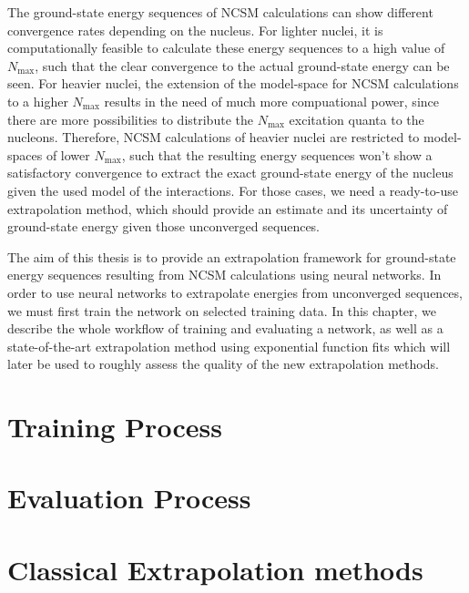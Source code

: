The ground-state energy sequences of NCSM calculations can show different convergence rates depending on the nucleus. For lighter nuclei, it is computationally feasible to calculate these energy sequences to a high value of $N_\mathrm{max}$, such that the clear convergence to the actual ground-state energy can be seen. For heavier nuclei, the extension of the model-space for NCSM calculations to a higher $N_\mathrm{max}$ results in the need of much more compuational power, since there are more possibilities to distribute the $N_\mathrm{max}$ excitation quanta to the nucleons. Therefore, NCSM calculations of heavier nuclei are restricted to model-spaces of lower $N_\mathrm{max}$, such that the resulting energy sequences won't show a satisfactory convergence to extract the exact ground-state energy of the nucleus given the used model of the interactions. For those cases, we need a ready-to-use extrapolation method, which should provide an estimate and its uncertainty of ground-state energy given those unconverged sequences.

The aim of this thesis is to provide an extrapolation framework for ground-state energy sequences resulting from NCSM calculations using neural networks. In order to use neural networks to extrapolate energies from unconverged sequences, we must first train the network on selected training data. In this chapter, we describe the whole workflow of training and evaluating a network, as well as a state-of-the-art extrapolation method using exponential function fits which will later be used to roughly assess the quality of the new extrapolation methods.

\section{Training Process}

\section{Evaluation Process}

\section{Classical Extrapolation methods}
\label{sec:classical_extrapolation}

